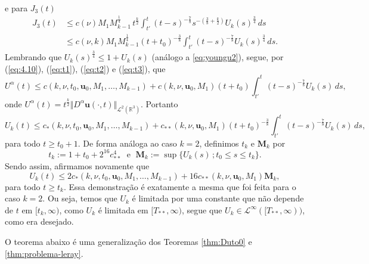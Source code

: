 \documentclass[a4paper, 11pt]{book}
\theoremstyle{definition}
\newcommand{\bR}{\mathbb{R}}
\newcommand{\bu}{\mathbf{u}}
\newcommand{\cL}{\mathcal{L}}
\begin{document}
\begin{prf}
\begin{equation}
\begin{aligned}
        \end{aligned}
    \end{equation}
    e para $J_3(t)$
    \begin{equation} \label{eq:t3}
        \begin{aligned}
            J_3(t) &\leqslant c(\nu) M_1 M_{k-1}^{\frac{1}{4}} \, t^{\frac{k}{2}} \int_{t'}^{t} (t - s)^{-\frac{7}{8}} s^{-\left( \frac{3}{8} + \frac{k}{2} \right)} U_k(s)^{\frac{3}{4}} \,ds\\
            &\leqslant c(\nu,k) M_1 M_{k-1}^{\frac{1}{4}} (t + t_0)^{-\frac{3}{8}} \int_{t'}^t (t - s)^{-\frac{7}{8}} U_k(s)^{\frac{3}{4}}\,ds.
        \end{aligned}
    \end{equation}
    Lembrando que $U_k(s)^{\frac{3}{4}} \leqslant 1 + U_k(s)$ (análogo a \ref{eq:youngu2}), segue, por (\ref{eq:4.10}), (\ref{eq:t1}), (\ref{eq:t2}) e (\ref{eq:t3}), que
    \[
        U^\alpha(t) \leqslant c(k,\nu, t_0, \bu_0, M_1,\dots,M_{k-1}) + c(k,\nu,\bu_0, M_1) (t + t_0) \int_{t'}^t (t-s)^{-\frac{7}{8}} U_k(s)\,ds,
    \]
    onde $U^\alpha(t) = t^{\frac{k}{2}} \Vert D^\alpha \bu(\cdot,t) \Vert_{\cL^2(\bR^3)}$.
    Portanto
    \[
        U_k(t) \leqslant c_*(k,\nu, t_0, \bu_0, M_1,\dots,M_{k-1}) + c_{**}(k,\nu,\bu_0, M_1) (t + t_0)^{-\frac{3}{8}} \int_{t'}^t (t-s)^{-\frac{7}{8}} U_k(s)\,ds,
    \]
    para todo $t \geqslant t_0 + 1$.
    De forma análoga ao caso $k = 2$, definimos $t_k$ e $\mathbf{M}_k$ por
    \[
        t_k := 1 + t_0 + 2^{16}c_{**}^4 \;\text{ e }\; \mathbf{M}_k := \sup \{U_k(s) \,; t_0 \leqslant s \leqslant t_k\}.
    \]
    Sendo assim, afirmamos novamente que
    \[
        U_k(t) \leqslant 2c_*(k,\nu,t_0,\bu_0,M_1,\dots,M_{k-1}) + 16 c_{**} (k,\nu,\bu_0,M_1) \mathbf{M}_k,
    \]
    para todo $t \geqslant t_k$.
    Essa demonstração é exatamente a mesma que foi feita para o caso $k = 2$.
    Ou seja, temos que $U_k$ é limitada por uma constante que não depende de $t$ em $[t_k,\infty)$, como $U_k$ é limitada em $[T_{**}, \infty)$, segue que $U_k \in \cL^\infty([T_{**}, \infty))$, como era desejado.
\end{prf}

O teorema abaixo é uma generalização dos Teoremas \ref{thm:Duto0} e \ref{thm:problema-leray}.
\end{document}
